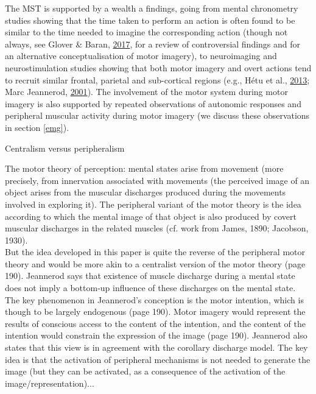 \documentclass[a4paper,12pt,twoside,openright,oldfontcommands]{memoir}
\begin{document}
The MST is supported by a wealth a findings, going from mental
chronometry studies showing that the time taken to perform an action is
often found to be similar to the time needed to imagine the
corresponding action (though not always, see Glover \& Baran,
\protect\hyperlink{ref-glover_motor-cognitive_2017}{2017}, for a review
of controversial findings and for an alternative conceptualisation of
motor imagery), to neuroimaging and neurostimulation studies showing
that both motor imagery and overt actions tend to recruit similar
frontal, parietal and sub-cortical regions (e.g., Hétu et al.,
\protect\hyperlink{ref-hetu_neural_2013}{2013}; Marc Jeannerod,
\protect\hyperlink{ref-jeannerod_neural_2001}{2001}). The involvement of
the motor system during motor imagery is also supported by repeated
observations of autonomic responses and peripheral muscular activity
during motor imagery (we discuss these observations in section
\ref{emg}).

\vspace{2mm}

\begin{mybox}[label = centralism]{Centralism versus peripheralism}

The motor theory of perception: mental states arise from movement (more precisely, from innervation associated with movements (the perceived image of an object arises from the muscular discharges produced during the movements involved in exploring it). The peripheral variant of the motor theory is the idea according to which the mental image of that object is also produced by covert muscular discharges in the related muscles (cf. work from James, 1890; Jacobson, 1930).\\

But the idea developed in this paper is quite the reverse of the peripheral motor theory and would be more akin to a centralist version of the motor theory (page 190). Jeannerod says that existence of muscle discharge during a mental state does not imply a bottom-up influence of these discharges on the mental state. The key phenomenon in Jeannerod’s conception is the motor intention, which is though to be largely endogenous (page 190). Motor imagery would represent the results of conscious access to the content of the intention, and the content of the intention would constrain the expression of the image (page 190). Jeannerod also states that this view is in agreement with the corollary discharge model. The key idea is that the activation of peripheral mechanisms is not needed to generate the image (but they can be activated, as a consequence of the activation of the image/representation)...

\end{mybox}
\end{document}

